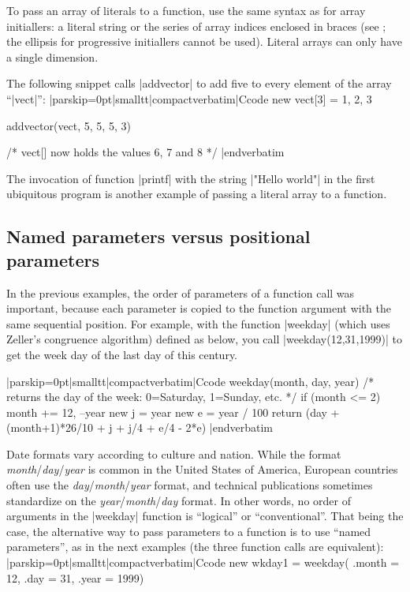   
To pass an array of literals to a
function, use the same syntax as for array initiallers: a literal string or
the series of array indices enclosed in braces (see ;
the ellipsis for progressive initiallers cannot be used). Literal arrays can
only have a single dimension.

The following snippet calls |addvector| to add five to every element of the
array ``|vect|'':
\listingx\verbatim|parskip=0pt|smalltt|compactverbatim|Ccode
new vect[3] = { 1, 2, 3 }

addvector(vect, {5, 5, 5}, 3)

/* vect[] now holds the values 6, 7 and 8 */
|endverbatim\endlistingx

\noindent{}%
The invocation of function |printf| with the string |"Hello world\n"| in the
first ubiquitous program is another example of passing a literal array to a
function.


\subsection{Named parameters versus positional parameters}
 
In the previous examples, the order of parameters of a function call was
important, because each parameter is copied to the function argument with the
same sequential position. For example, with the function |weekday|
(which uses Zeller's congruence algorithm) defined as below,
you call |weekday(12,31,1999)| to get the week day of the last day of this
century.

\goodbreak
{}
\listingx\verbatim|parskip=0pt|smalltt|compactverbatim|Ccode
weekday(month, day, year)
    {
    /* returns the day of the week: 0=Saturday, 1=Sunday, etc. */
    if (month <= 2)
        month += 12, --year
    new j = year %
    new e = year / 100
    return (day + (month+1)*26/10 + j + j/4 + e/4 - 2*e) %
    }
|endverbatim\endlistingx

Date formats vary according to culture and nation. While the format
{\it month}\slash{\it day}\slash{\it year\/} is common in the United States of
America, European countries often use the
{\it day}\slash{\it month}\slash{\it year\/} format, and technical
publications sometimes standardize on the
{\it year}\slash{\it month}\slash{\it day\/} format. In other words, no order
of arguments in the |weekday| function is ``logical'' or ``conventional''.
That being the case, the alternative way to pass parameters to a function is
to use ``named parameters'', as in the next examples (the three function calls
are equivalent): \medskip
\listingx\verbatim|parskip=0pt|smalltt|compactverbatim|Ccode
  new wkday1 = weekday( .month = 12, .day = 31, .year = 1999)

